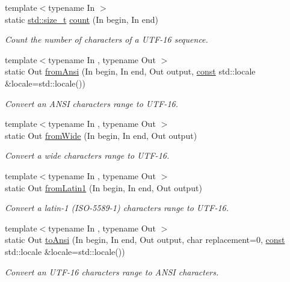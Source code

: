\begin{DoxyCompactItemize}
{\footnotesize template$<$typename In $>$ }\\static \hyperlink{nc__alloc_8h_a7b60c5629e55e8ec87a4547dd4abced4}{std\-::size\-\_\-t} \hyperlink{classsf_1_1_utf_3_0116_01_4_a6df8d9be8211ffe1095b3b82eac83f6f}{count} (In begin, In end)
\begin{DoxyCompactList}\small\item\em Count the number of characters of a U\-T\-F-\/16 sequence. \end{DoxyCompactList}\item 
{\footnotesize template$<$typename In , typename Out $>$ }\\static Out \hyperlink{classsf_1_1_utf_3_0116_01_4_a8a595dc1ea57ecf7aad944964913f0ff}{from\-Ansi} (In begin, In end, Out output, \hyperlink{term__entry_8h_a57bd63ce7f9a353488880e3de6692d5a}{const} std\-::locale \&locale=std\-::locale())
\begin{DoxyCompactList}\small\item\em Convert an A\-N\-S\-I characters range to U\-T\-F-\/16. \end{DoxyCompactList}\item 
{\footnotesize template$<$typename In , typename Out $>$ }\\static Out \hyperlink{classsf_1_1_utf_3_0116_01_4_a263423929b6f8e4d3ad09b45ac5cb0a1}{from\-Wide} (In begin, In end, Out output)
\begin{DoxyCompactList}\small\item\em Convert a wide characters range to U\-T\-F-\/16. \end{DoxyCompactList}\item 
{\footnotesize template$<$typename In , typename Out $>$ }\\static Out \hyperlink{classsf_1_1_utf_3_0116_01_4_a52293df75893733fe6cf84b8a017cbf7}{from\-Latin1} (In begin, In end, Out output)
\begin{DoxyCompactList}\small\item\em Convert a latin-\/1 (I\-S\-O-\/5589-\/1) characters range to U\-T\-F-\/16. \end{DoxyCompactList}\item 
{\footnotesize template$<$typename In , typename Out $>$ }\\static Out \hyperlink{classsf_1_1_utf_3_0116_01_4_a6d2bfbdfe46364bd49bca28a410b18f7}{to\-Ansi} (In begin, In end, Out output, char replacement=0, \hyperlink{term__entry_8h_a57bd63ce7f9a353488880e3de6692d5a}{const} std\-::locale \&locale=std\-::locale())
\begin{DoxyCompactList}\small\item\em Convert an U\-T\-F-\/16 characters range to A\-N\-S\-I characters. \end{DoxyCompactList}\item 

\end{DoxyCompactItemize}
